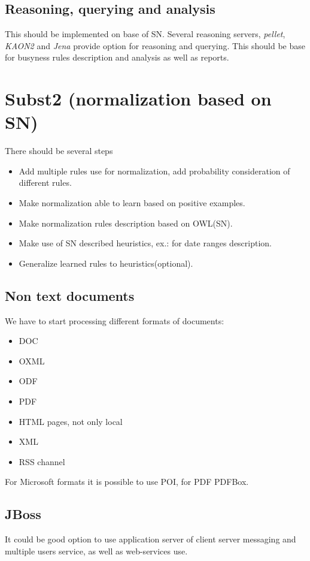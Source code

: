 \documentclass[12pt]{article}
\begin{document}
\subsection{Reasoning, querying and analysis}
This should be implemented on base of SN. Several reasoning servers, \emph{pellet}, \emph{KAON2} and \emph{Jena} provide option for reasoning and querying. This should be base for busyness rules description and analysis as well as reports.

\section{Subst2 (normalization based on SN)}
There should be several steps
\begin{itemize}
  \item Add multiple rules use for normalization, add probability consideration of different rules.
  \item Make normalization able to learn based on positive examples.
  \item Make normalization rules description based on OWL(SN).
  \item Make use of SN described heuristics, ex.: for date ranges description.
  \item Generalize learned rules to heuristics(optional).
\end{itemize}

\subsection{Non text documents}
We have to start processing different formats of documents:
\begin{itemize}
  \item DOC
  \item OXML
  \item ODF
  \item PDF
  \item HTML pages, not only local
  \item XML
  \item RSS channel
\end{itemize}
For Microsoft formats it is possible to use POI, for PDF PDFBox.

\subsection{JBoss}
It could be good option to use application server of client server messaging and multiple users service, as well as web-services use.
\end{document}
